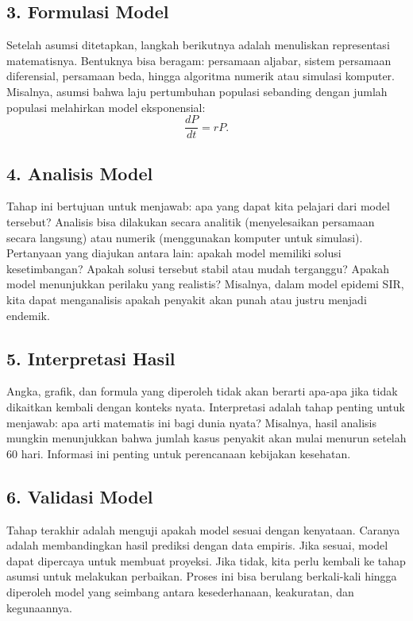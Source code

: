\documentclass{bukumjh}
\begin{document}
\subsection*{3. Formulasi Model}
Setelah asumsi ditetapkan, langkah berikutnya adalah menuliskan representasi matematisnya. Bentuknya bisa beragam: persamaan aljabar, sistem persamaan diferensial, persamaan beda, hingga algoritma numerik atau simulasi komputer. Misalnya, asumsi bahwa laju pertumbuhan populasi sebanding dengan jumlah populasi melahirkan model eksponensial:
\[
\frac{dP}{dt} = rP.
\]

\subsection*{4. Analisis Model}
Tahap ini bertujuan untuk menjawab: apa yang dapat kita pelajari dari model tersebut? Analisis bisa dilakukan secara analitik (menyelesaikan persamaan secara langsung) atau numerik (menggunakan komputer untuk simulasi). Pertanyaan yang diajukan antara lain: apakah model memiliki solusi kesetimbangan? Apakah solusi tersebut stabil atau mudah terganggu? Apakah model menunjukkan perilaku yang realistis? Misalnya, dalam model epidemi SIR, kita dapat menganalisis apakah penyakit akan punah atau justru menjadi endemik.

\subsection*{5. Interpretasi Hasil}
Angka, grafik, dan formula yang diperoleh tidak akan berarti apa-apa jika tidak dikaitkan kembali dengan konteks nyata. Interpretasi adalah tahap penting untuk menjawab: apa arti matematis ini bagi dunia nyata? Misalnya, hasil analisis mungkin menunjukkan bahwa jumlah kasus penyakit akan mulai menurun setelah 60 hari. Informasi ini penting untuk perencanaan kebijakan kesehatan.

\subsection*{6. Validasi Model}
Tahap terakhir adalah menguji apakah model sesuai dengan kenyataan. Caranya adalah membandingkan hasil prediksi dengan data empiris. Jika sesuai, model dapat dipercaya untuk membuat proyeksi. Jika tidak, kita perlu kembali ke tahap asumsi untuk melakukan perbaikan. Proses ini bisa berulang berkali-kali hingga diperoleh model yang seimbang antara kesederhanaan, keakuratan, dan kegunaannya.

\medskip
\end{document}
